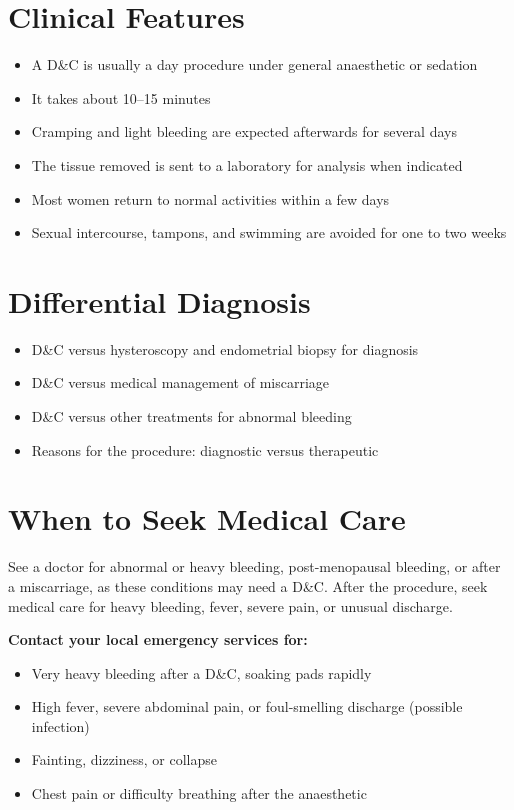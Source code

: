 \section*{Clinical Features}
\begin{itemize}
    \item A D\&C is usually a day procedure under general anaesthetic or sedation
    \item It takes about 10--15 minutes
    \item Cramping and light bleeding are expected afterwards for several days
    \item The tissue removed is sent to a laboratory for analysis when indicated
    \item Most women return to normal activities within a few days
    \item Sexual intercourse, tampons, and swimming are avoided for one to two weeks
\end{itemize}

\section*{Differential Diagnosis}
\begin{itemize}
    \item D\&C versus hysteroscopy and endometrial biopsy for diagnosis
    \item D\&C versus medical management of miscarriage
    \item D\&C versus other treatments for abnormal bleeding
    \item Reasons for the procedure: diagnostic versus therapeutic
\end{itemize}

\section*{When to Seek Medical Care}
See a doctor for abnormal or heavy bleeding, post-menopausal bleeding, or after a miscarriage, as these conditions may need a D\&C. After the procedure, seek medical care for heavy bleeding, fever, severe pain, or unusual discharge.

\textbf{Contact your local emergency services for:}
\begin{itemize}
    \item Very heavy bleeding after a D\&C, soaking pads rapidly
    \item High fever, severe abdominal pain, or foul-smelling discharge (possible infection)
    \item Fainting, dizziness, or collapse
    \item Chest pain or difficulty breathing after the anaesthetic
\end{itemize}

